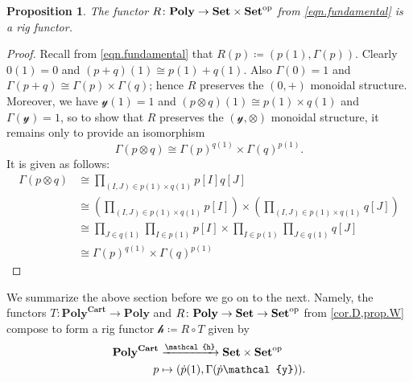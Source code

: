\documentclass[11pt, one side, article]{memoir}
\theoremstyle{definition}
\theoremstyle{plain}
\newtheorem{proposition}[definitionx]{Proposition}
\newenvironment{remark}
  {\pushQED{\qed}\renewcommand{\qedsymbol}{$\lozenge$}\remarkx}
  {\popQED\endremarkx}
\newcommand{\Cat}[1]{\mathbf{#1}}%
\newcommand{\To}[2][]{\xrightarrow[#1]{#2}}
\newcommand{\op}{^\tn{op}}
\newcommand{\tn}[1]{\textnormal{#1}}
\newcommand{\smset}{\Cat{Set}}
\newcommand{\yon}{\mathcal{y}}
\newcommand{\poly}{\Cat{Poly}}
\newcommand{\polycart}{\poly^{\Cat{Cart}}}
\newcommand{\hh}{\mathcal{h}}
\newcommand{\0}{\textsf{0}}
\newcommand{\1}{\tn{\textsf{1}}}
\newcommand{\R}{R}
\newcommand{\T}{T}
\newcommand{\qqand}{\qquad\text{and}\qquad}
\begin{document}
\begin{proposition}\label{prop.W}
The functor $\R\colon\poly\to\smset\times\smset\op$ from \eqref{eqn.fundamental} is a rig functor.
\end{proposition}
\begin{proof}
Recall from \eqref{eqn.fundamental} that $\R(p)\coloneqq(p(1),\Gamma(p))$. Clearly $0(1)=0$ and $(p+q)(1)\cong p(1)+q(1)$. Also $\Gamma(0)=1$ and $\Gamma(p+q)\cong\Gamma(p)\times\Gamma(q)$; hence $\R$ preserves the $(0,+)$ monoidal structure. Moreover, we have $\yon(1)=1$ and $(p\otimes q)(1)\cong p(1)\times q(1)$ and $\Gamma(\yon)= 1$, so to show that $\R$ preserves the $(\yon,\otimes)$ monoidal structure, it remains only to provide an isomorphism 
\[
  \Gamma(p\otimes q)\cong \Gamma(p)^{q(1)}\times\Gamma(q)^{p(1)}.
\]
It is given as follows:
\begin{align*}
	\Gamma(p\otimes q)&\cong
	\prod_{(I,J)\in p(1)\times q(1)}p[I]q[J]\\&\cong
	\left(\prod_{(I,J)\in p(1)\times q(1)}p[I]\right)\times
		\left(\prod_{(I,J)\in p(1)\times q(1)}q[J]\right)\\&\cong
	\prod_{J\in q(1)}\prod_{I\in p(1)}p[I]\times\prod_{I\in p(1)}\prod_{J\in q(1)}q[J]\\&\cong
	\Gamma(p)^{q(1)}\times\Gamma(q)^{p(1)}	
\end{align*}
\end{proof}



We summarize the above section before we go on to the next. Namely, the functors $\T\colon\polycart\to\poly$ and $\R\colon\poly\to\smset\to\smset\op$ from \cref{cor.D,prop.W} compose to form a rig functor $\hh\coloneqq \R\circ \T$ given by
\begin{equation}\label{eqn.entropy_data}
\begin{aligned}
	\polycart&\To{\mathcal{h}}\smset\times\smset\op\\
	p&\mapsto (\dot{p}(1),\Gamma(\dot{p}\yon)).
\end{aligned}
\end{equation}
\end{document}
